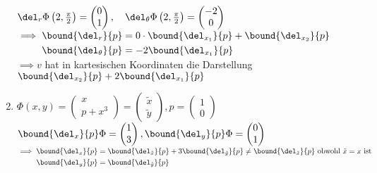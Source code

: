 \begin{exmp}
\begin{enumerate}[label={\roman*})]
\begin{minipage}{\linewidth}
				$ \del_r \Phi \left(2,\frac{\pi}{2} \right) = \begin{pmatrix}
					0\\1
				\end{pmatrix}, \quad \del_\theta \Phi \left( 2,\frac{\pi}{2} \right) = \begin{pmatrix}
					-2\\0
				\end{pmatrix} $\\
				$ \implies \begin{aligned}[t]
					\bound{\del_r}{p} &= 0 \cdot \bound{\del_{x_1}}{p} + \bound{\del_{x_2}}{p}\\
					\bound{\del_\theta}{p} &= -2 \bound{\del_{x_1}}{p}
				\end{aligned} $\\
				$ \implies v $ hat in kartesischen Koordinaten die Darstellung $ \bound{\del_{x_2}}{p} + 2 \bound{\del_{x_1}}{p} $
			\end{minipage}
		\item $ \Phi(x,y) = \begin{pmatrix}
			x\\p+x^3
			\end{pmatrix} = \begin{pmatrix}
				\tilde{x}\\\tilde{y}
			\end{pmatrix}, p = \begin{pmatrix}
				1\\0
			\end{pmatrix} $\\
			$ \bound{\del_x}{p}\Phi = \begin{pmatrix}
				1\\3
			\end{pmatrix}, \bound{\del_y}{p}\Phi = \begin{pmatrix}
				0\\1
			\end{pmatrix} $\\
			$ \implies \begin{aligned}[t]
				\bound{\del_x}{p} &= \bound{\del_{\tilde{x}}}{p} + 3\bound{\del_{\tilde{y}}}{p} \neq \bound{\del_{\tilde{x}}}{p} \ \text{obwohl } \tilde{x} = x\ \text{ist}\\
				\bound{\del_y}{p} &= \bound{\del_{\tilde{y}}}{p}
			\end{aligned}$
	\end{enumerate}
\end{exmp}

